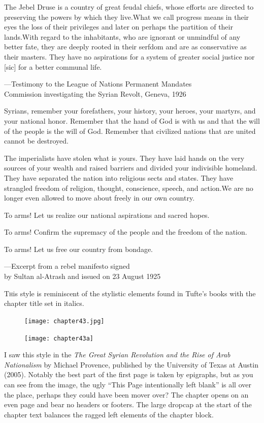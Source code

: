 \epigraph{The Jebel Druse is a country of great feudal chiefs, whose efforts are
directed to preserving the powers by which they live.What we call
progress means in their eyes the loss of their privileges and later on
perhaps the partition of their lands.With regard to the inhabitants,
who are ignorant or unmindful of any better fate, they are deeply rooted
in their serfdom and are as conservative as their masters. They have no
aspirations for a system of greater social justice nor [sic] for a better
communal life.}{---Testimony to the League of Nations Permanent Mandates\\
Commission investigating the Syrian Revolt, Geneva, 1926}

\epigraph{Syrians, remember your forefathers, your history, your heroes, your
martyrs, and your national honor. Remember that the hand of God is
with us and that the will of the people is the will of God. Remember
that civilized nations that are united cannot be destroyed.

The imperialists have stolen what is yours. They have laid hands on
the very sources of your wealth and raised barriers and divided your
indivisible homeland. They have separated the nation into religious
sects and states. They have strangled freedom of religion, thought,
conscience, speech, and action.We are no longer even allowed to move
about freely in our own country.

To arms! Let us realize our national aspirations and sacred hopes.

To arms! Confirm the supremacy of the people and the freedom of
the nation.

To arms! Let us free our country from bondage.}{---Excerpt from a rebel manifesto signed\\ by Sultan
al-Atrash and issued on 23 August 1925}

\lettrine{T}his style is reminiscent of the stylistic elements found in Tufte's books with the chapter title set in italics.
\begin{figure}[ht]
\centering
\texttt{[image: chapter43.jpg]}\par
\texttt{[image: chapter43a]}
\end{figure}
I saw this style in the \textit{The Great Syrian Revolution and the Rise of Arab Nationalism} by Michael Provence, published by the University of Texas at Austin (2005). Notably the best part of the first page is taken by epigraphs, but as you can see from the image, the ugly ``This Page intentionally left blank'' is all over the place, perhaps they could have been mover over? The chapter opens on an even page and bear no headers or footers. The large dropcap at the start of the chapter text balances the ragged left elements of the chapter block.
\lipsum


